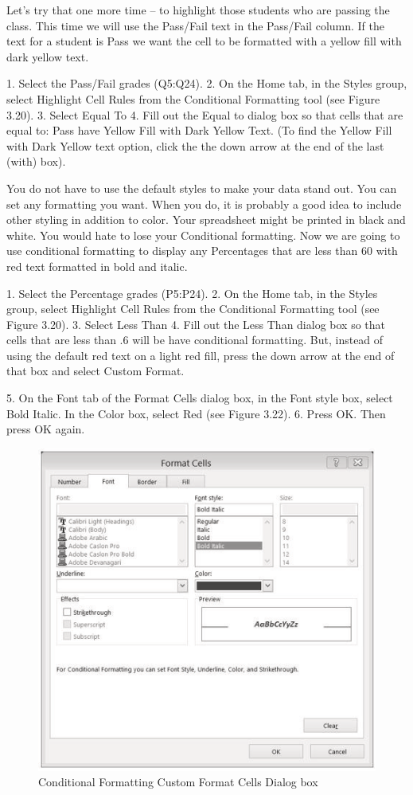 Let’s try that one more time – to highlight those students who are passing the class. This time we will
use the Pass/Fail text in the Pass/Fail column. If the text for a student is Pass we want the cell to be
formatted with a yellow fill with dark yellow text.

1. Select the Pass/Fail grades (Q5:Q24).
2. On the Home tab, in the Styles group, select Highlight Cell Rules from the Conditional
Formatting tool (see Figure 3.20).
3. Select Equal To
4. Fill out the Equal to dialog box so that cells that are equal to: Pass have Yellow Fill with Dark
Yellow Text. (To find the Yellow Fill with Dark Yellow text option, click the the down arrow at
the end of the last (with) box).

You do not have to use the default styles to make your data stand out. You can set any formatting
you want. When you do, it is probably a good idea to include other styling in addition to color. Your
spreadsheet might be printed in black and white. You would hate to lose your Conditional formatting.
Now we are going to use conditional formatting to display any Percentages that are less than 60%
with red text formatted in bold and italic.

1. Select the Percentage grades (P5:P24).
2. On the Home tab, in the Styles group, select Highlight Cell Rules from the Conditional
Formatting tool (see Figure 3.20).
3. Select Less Than
4. Fill out the Less Than dialog box so that cells that are less than .6 will be have conditional
formatting. But, instead of using the default red text on a light red fill, press the down arrow at
the end of that box and select Custom Format.

5. On the Font tab of the Format Cells dialog box, in the Font style box, select Bold Italic. In the
Color box, select Red (see Figure 3.22).
6. Press OK. Then press OK again.


\begin{figure}[H]
	\centering
	\includegraphics[width=\maxwidth{.95\linewidth}]{gfx/ch03_fig22}
	\caption{Conditional Formatting Custom Format Cells Dialog box}
	\label{03:fig22}
\end{figure}



